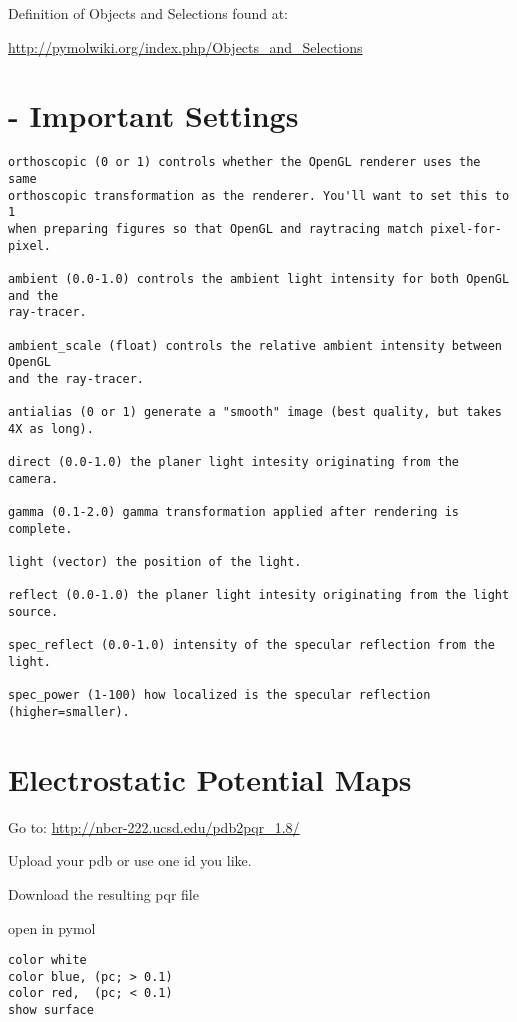 \documentclass[10pt, oneside, pdftex]{article}
\begin{document}
Definition of Objects and Selections found at:

\url{http://pymolwiki.org/index.php/Objects_and_Selections}

\section*{ - Important Settings}

\begin{Verbatim}
orthoscopic (0 or 1) controls whether the OpenGL renderer uses the same
orthoscopic transformation as the renderer. You'll want to set this to 1
when preparing figures so that OpenGL and raytracing match pixel-for-pixel.

ambient (0.0-1.0) controls the ambient light intensity for both OpenGL and the
ray-tracer.

ambient_scale (float) controls the relative ambient intensity between OpenGL
and the ray-tracer.

antialias (0 or 1) generate a "smooth" image (best quality, but takes
4X as long).

direct (0.0-1.0) the planer light intesity originating from the camera.

gamma (0.1-2.0) gamma transformation applied after rendering is complete.

light (vector) the position of the light.

reflect (0.0-1.0) the planer light intesity originating from the light source.

spec_reflect (0.0-1.0) intensity of the specular reflection from the light.

spec_power (1-100) how localized is the specular reflection (higher=smaller).
\end{Verbatim}


\section*{Electrostatic Potential Maps}
Go to:
\url{http://nbcr-222.ucsd.edu/pdb2pqr_1.8/}

Upload your pdb or use one id you like.

Download the resulting pqr file

open in pymol


\begin{Verbatim}
color white
color blue, (pc; > 0.1)
color red,  (pc; < 0.1)
show surface
\end{Verbatim}
\end{document}
